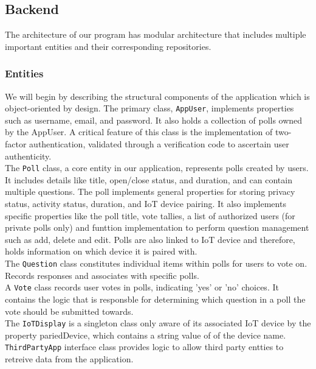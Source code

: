 \subsection{Backend}
The architecture of our program has modular architecture that includes multiple important entities and their corresponding repositories.

\subsubsection{Entities}
We will begin by describing the structural components of the application which is object-oriented by design. The primary class, \texttt{AppUser}, implements properties such as username, email, and password. It also holds a collection of polls owned by the AppUser.  A critical feature of this class is the implementation of two-factor authentication, validated through a verification code to ascertain user authenticity. \\

\noindent The \texttt{Poll} class, a core entity in our application, represents polls created by users. It includes details like title, open/close status, and duration, and can contain multiple questions. The poll implements general properties for storing privacy status, activity status, duration, and IoT device pairing. It also implements specific properties like the poll title, vote tallies, a list of authorized users (for private polls only) and funttion implementation to perform question management such as add, delete and edit. Polls are also linked to IoT device and therefore, holds information on which device it is paired with.\\

\noindent The \texttt{Question} class constitutes individual items within polls for users to vote on. Records responses and associates with specific polls.\\

\noindent A \texttt{Vote} class records user votes in polls, indicating 'yes' or 'no' choices. It contains the logic that is responsble for determining which question in a poll the vote should be submitted towards.\\

\noindent The \texttt{IoTDisplay} is a singleton class only aware of its associated IoT device by the property pariedDevice, which contains a string value of of the device name. \\

\noindent \texttt{ThirdPartyApp} interface class provides logic to allow third party entties to retreive data from the application. \\ \\


